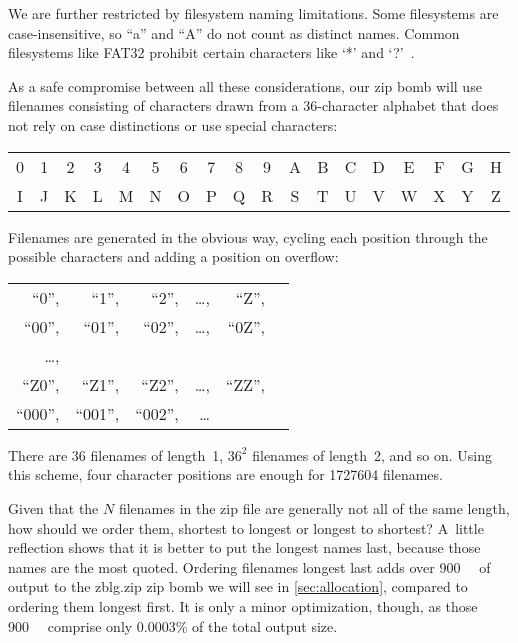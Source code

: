 \documentclass[letterpaper,twocolumn,10pt]{article}
\newcommand{\MB}{\mega\byte}
\begin{document}
We are further restricted by filesystem naming limitations.
Some filesystems are case-insensitive, so ``a'' and ``A'' do not count as distinct names.
Common filesystems like FAT32 prohibit certain characters like
`*' and `?'~\cite[\S Limits]{wiki-fs}.

As a safe compromise between all these considerations,
our zip bomb will use filenames consisting of characters
drawn from a 36-character alphabet
that does not
rely on case distinctions
or use special characters:

\begin{center}
\setlength{\tabcolsep}{2pt}
\begin{tabular}{cccccccccccccccccc}
0 & 1 & 2 & 3 & 4 & 5 & 6 & 7 & 8 & 9 & A & B & C & D & E & F & G & H \\
I & J & K & L & M & N & O & P & Q & R & S & T & U & V & W & X & Y & Z
\end{tabular}
\end{center}

\noindent
Filenames are generated in the obvious way,
cycling each position through the possible characters
and adding a position on overflow:

\begin{center}
\setlength{\tabcolsep}{2pt}
\begin{tabular}{rrrrrl}
``\mbox{0}'', &
``\mbox{1}'', &
``\mbox{2}'', &
\ldots, &
``\mbox{Z}'',
\\
``\mbox{00}'', &
``\mbox{01}'', &
``\mbox{02}'', &
\ldots, &
``\mbox{0Z}'',
\\
\ldots,
\\
``\mbox{Z0}'', &
``\mbox{Z1}'', &
``\mbox{Z2}'', &
\ldots, &
``\mbox{ZZ}'',
\\
``\mbox{000}'', &
``\mbox{001}'', &
``\mbox{002}'', &
\ldots
\end{tabular}
\end{center}

\noindent
There are $36$ filenames of length~\num{1},
$36^2$ filenames of length~\num{2}, and so on.
Using this scheme, four character positions are enough for
\num{1727604} filenames.


Given that the $N$ filenames in the zip file
are generally not all of the same length,
how should we order them,
shortest to longest or longest to shortest?
A~little reflection shows that it is better to
put the longest names last, because those names are the most quoted.
Ordering filenames longest last
adds over \SI{900}{\MB} of output
to the \mbox{zblg.zip} zip bomb we will see in \autoref{sec:allocation},
compared to ordering them longest first.
It is only a minor optimization, though,
as those \SI{900}{\MB} comprise only \num{0.0003}\%
of the total output size.
\end{document}
